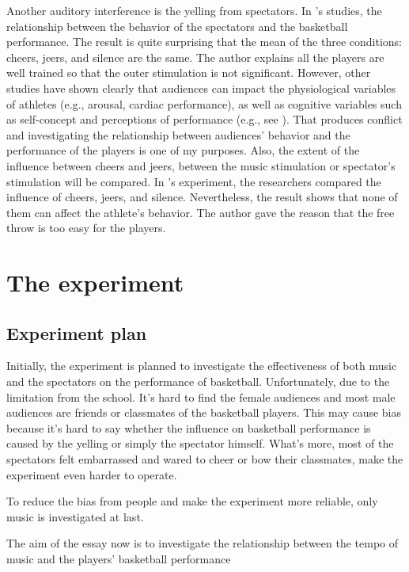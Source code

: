 \documentclass{article}
\begin{document}
Another auditory interference is the yelling from spectators. In \textcite{eptingCheersVsJeers}'s studies, the relationship between the behavior of the spectators and the basketball performance. The result is quite surprising that the mean of the three conditions: cheers, jeers, and silence are the same. The author explains all the players are well trained so that the outer stimulation is not significant. However, other studies have shown clearly that audiences can impact the physiological variables of athletes (e.g., arousal, cardiac performance), as well as cognitive variables such as self-concept and perceptions of performance  (e.g., see \textcite{jonesAllWorldStage2007}). That produces conflict and investigating the relationship between audiences' behavior and the performance of the players is one of my purposes. Also, the extent of the influence between cheers and jeers, between the music stimulation or spectator's stimulation will be compared. In \textcite{eptingCheersVsJeers}'s experiment,  the researchers compared the influence of cheers, jeers, and silence. Nevertheless, the result shows that none of them can affect the athlete's behavior. The author gave the reason that the free throw is too easy for the players.

\section{The experiment}

\subsection{Experiment plan}
Initially, the experiment is planned to investigate the effectiveness of both music and the spectators on the performance of basketball. Unfortunately, due to the limitation from the school. It's hard to find the female audiences and most male audiences are friends or classmates of the basketball players. This may cause bias because it's hard to say whether the influence on basketball performance is caused by the yelling or simply the spectator himself. What's more, most of the spectators felt embarrassed and wared to cheer or bow their classmates, make the experiment even harder to operate.

To reduce the bias from people and make the experiment more reliable, only music is investigated at last. 

The aim of the essay now is to investigate the relationship between the tempo of music and the players' basketball performance
\end{document}
